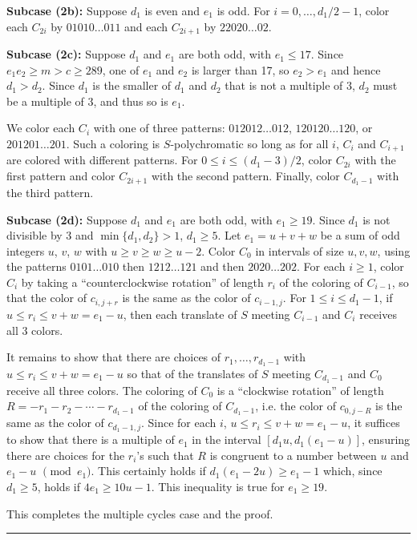 \documentclass[12pt]{article}
\newenvironment{proofof}[1]{{\bf Proof of #1:  }}{\hfill\rule{2mm}{2mm}}
\begin{document}
\begin{proofof}{Theorem~\ref{ps34}}
\textbf{Subcase (2b):} Suppose $d_1$ is even and $e_1$ is odd. For $i=0,\ldots,d_1/2 -1$, color each $C_{2i}$ by  $01010\ldots 011$ and each $C_{2i+1}$ by $22020\ldots 02$.

\textbf{Subcase (2c):} Suppose $d_1$ and $e_1$ are both odd, with $e_1\leq 17$. Since $e_1e_2\geq m>c \ge 289$, one of $e_1$ and $e_2$ is larger than 17, so $e_2> e_1$ and hence $d_1 > d_2$.  Since $d_1$ is the smaller of $d_1$ and $d_2$ that is not a multiple of 3, $d_2$ must be a multiple of 3, and thus so is $e_1$.

We color each $C_i$ with one of three patterns: $012012\ldots012$, $120120\ldots 120$, or $201201\ldots201$. Such a coloring is $S$-polychromatic so long as for all $i$, $C_i$ and $C_{i+1}$ are colored with different patterns. For $0 \le i \le (d_1-3)/2$, color $C_{2i}$ with the first pattern and color $C_{2i+1}$ with the second pattern. Finally, color $C_{d_1-1}$ with the third pattern.
 
\textbf{Subcase (2d):} Suppose $d_1$ and $e_1$ are both odd, with $e_1\geq 19$. Since $d_1$ is not divisible by 3 and $\min\{d_1,d_2\}>1$, $d_1\geq 5$.  Let  $e_1=u+v+w$ be a sum of odd integers $u$, $v$, $w$ with $u\geq v\geq w\geq u-2$.  Color $C_0$ in intervals of size $u,v,w$, using the patterns $0101\ldots010$ then $1212\ldots 121$ and then $2020\ldots 202$. For each  $i\geq 1$, color $C_i$ by taking a ``counterclockwise rotation'' of length $r_i$ of the coloring of $C_{i-1}$, so that the color of $c_{i,j+r}$ is the same as the color of $c_{i-1,j}$. For $1 \le i \le d_1-1$, if $u\leq r_i \leq v+w=e_1-u$, then each translate of $S$ meeting $C_{i-1}$ and $C_{i}$ receives all 3 colors. %

It remains to show that there are choices of $r_1, \ldots, r_{d_1-1}$ with $u\leq r_i \leq v+w=e_1-u$ so that of the translates of $S$ meeting $C_{d_1-1}$ and $C_0$ receive all three colors. The coloring of $C_0$ is a ``clockwise rotation'' of length $R= -r_1-r_2 -\cdots -r_{d_1-1}$ of the coloring of $C_{d_1-1}$, i.e. the  color of $c_{0,j-R}$ is the same as the color of $c_{d_1-1,j}$. Since for each $i$, $u\leq r_i \leq v+w=e_1-u$, it suffices to show that there is a multiple of $e_1$ in the interval $[d_1u,d_1(e_1-u)]$, ensuring there are choices for the $r_i$'s such that $R$ is congruent to a number between $u$ and $e_1-u$ $\pmod{e_1}$. This certainly holds if $d_1(e_1-2u)\geq e_1-1$ which, since $d_1\geq 5$, holds if $4e_1\geq 10u-1$. This inequality is true for $e_1\geq 19$.

This completes the multiple cycles case and the proof. 
\end{proofof}
\end{document}
